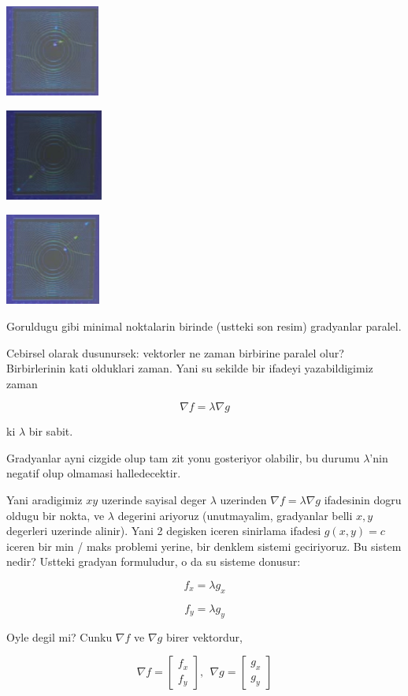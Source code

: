 \documentclass[12pt,fleqn]{article}
\begin{document}
\includegraphics[height=3cm]{13_4.png}

\includegraphics[height=3cm]{13_6.png}

\includegraphics[height=3cm]{13_5.png}

Goruldugu gibi minimal noktalarin birinde (ustteki son resim) gradyanlar
paralel. 

Cebirsel olarak dusunursek: vektorler ne zaman birbirine paralel olur?
Birbirlerinin kati olduklari zaman. Yani su sekilde bir ifadeyi
yazabildigimiz zaman

\[ \nabla f = \lambda \nabla g \]

ki $\lambda$ bir sabit. 

Gradyanlar ayni cizgide olup tam zit yonu gosteriyor olabilir, bu durumu
$\lambda$'nin negatif olup olmamasi halledecektir.

Yani aradigimiz $xy$ uzerinde sayisal deger $\lambda$ uzerinden $\nabla f =
\lambda \nabla g $ ifadesinin 
dogru oldugu bir nokta, ve $\lambda$ degerini ariyoruz (unutmayalim,
gradyanlar belli $x,y$ degerleri uzerinde alinir). Yani 2 degisken iceren
sinirlama  ifadesi $g(x,y)=c$ iceren bir min
/ maks problemi yerine, bir denklem sistemi geciriyoruz. Bu sistem nedir?
Ustteki gradyan formuludur, o da su sisteme donusur:

\[ f_x = \lambda g_x \]

\[ f_y = \lambda g_y \]

Oyle degil mi? Cunku $\nabla f$ ve $\nabla g$ birer vektordur, 

\[ 
\nabla f =
\left[\begin{array}{r}
f_x \\
f_y
\end{array}\right], \ \ 
\nabla g =
\left[\begin{array}{r}
g_x \\
g_y
\end{array}\right]
 \]
\end{document}
